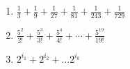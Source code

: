 \documentclass{article}
\begin{document}
\begin{enumerate}
                        \begin{enumerate}
                            \item $ \frac{1}{3}+\frac{1}{9}+\frac{1}{27}+\frac{1}{81} + \frac{1}{243}+ \frac{1}{729}$
                            \item $ \frac{5^2}{2!}+\frac{5^3}{3!}+\frac{5^4}{4!} + \cdots + \frac{5^{19}}{19!}$
                            \item $2^{i_1} + 2^{i_2} + \ldots 2^{i_k}$
                        \end{enumerate}
                \end{enumerate}
                
\end{document}
